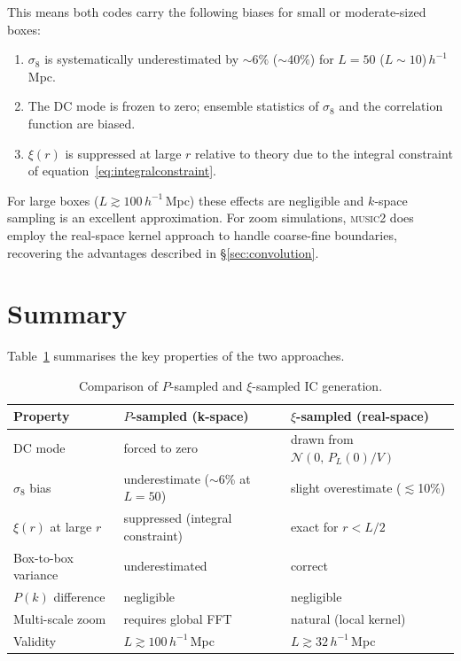 \documentclass[12pt]{article}
\begin{document}
This means both codes carry the following biases for small or
moderate-sized boxes:
%
\begin{enumerate}
  \item $\sigma_8$ is systematically underestimated by $\sim 6\%$
        ($\sim 40\%$) for $L = 50$ ($L \sim 10$)\,$h^{-1}$\,Mpc.
  \item The DC mode is frozen to zero; ensemble statistics of $\sigma_8$
        and the correlation function are biased.
  \item $\xi(r)$ is suppressed at large $r$ relative to theory due to
        the integral constraint of equation~\eqref{eq:integralconstraint}.
\end{enumerate}
%
For large boxes ($L \gtrsim 100\,h^{-1}$\,Mpc) these effects are
negligible and $k$-space sampling is an excellent approximation.  For
zoom simulations, \textsc{music2} does employ the real-space kernel
approach to handle coarse-fine boundaries, recovering the advantages
described in \S\ref{sec:convolution}.

\section{Summary}

Table~\ref{tab:summary} summarises the key properties of the two
approaches.

\begin{table}[h]
\centering
\caption{Comparison of $P$-sampled and $\xi$-sampled IC generation.}
\label{tab:summary}
\begin{tabular}{lll}
\hline\hline
Property & $P$-sampled (k-space) & $\xi$-sampled (real-space) \\
\hline
DC mode & forced to zero & drawn from $\mathcal{N}(0,\,P_L(0)/V)$ \\
$\sigma_8$ bias & underestimate ($\sim$6\% at $L=50$) & slight overestimate ($\lesssim$10\%) \\
$\xi(r)$ at large $r$ & suppressed (integral constraint) & exact for $r < L/2$ \\
Box-to-box variance & underestimated & correct \\
$P(k)$ difference & negligible & negligible \\
Multi-scale zoom & requires global FFT & natural (local kernel) \\
Validity & $L \gtrsim 100\,h^{-1}$\,Mpc & $L \gtrsim 32\,h^{-1}$\,Mpc \\
\hline
\end{tabular}
\end{table}
\end{document}
